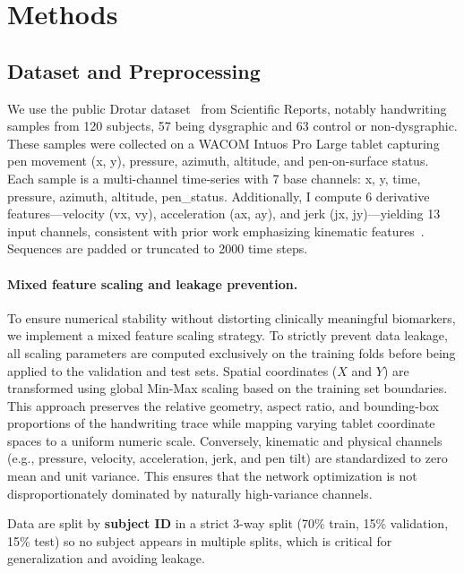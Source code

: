 \documentclass{article}
\begin{document}
\section{Methods}
\label{sec:methods}

\subsection{Dataset and Preprocessing}

We use the public Drotar dataset~\cite{drotar2020} from Scientific Reports, notably handwriting samples from 120 subjects, 57 being dysgraphic and 63 control or non-dysgraphic. These samples were collected on a WACOM Intuos Pro Large tablet capturing pen movement (x, y), pressure, azimuth, altitude, and pen-on-surface status. Each sample is a multi-channel time-series with 7 base channels: x, y, time, pressure, azimuth, altitude, pen\_status. Additionally, I compute 6 derivative features---velocity (vx, vy), acceleration (ax, ay), and jerk (jx, jy)---yielding 13 input channels, consistent with prior work emphasizing kinematic features~\cite{drotar2020, kunhoth2022}. Sequences are padded or truncated to 2000 time steps.

\paragraph{Mixed feature scaling and leakage prevention.} To ensure numerical stability without distorting clinically meaningful biomarkers, we implement a mixed feature scaling strategy. To strictly prevent data leakage, all scaling parameters are computed exclusively on the training folds before being applied to the validation and test sets. Spatial coordinates ($X$ and $Y$) are transformed using global Min-Max scaling based on the training set boundaries. This approach preserves the relative geometry, aspect ratio, and bounding-box proportions of the handwriting trace while mapping varying tablet coordinate spaces to a uniform numeric scale. Conversely, kinematic and physical channels (e.g., pressure, velocity, acceleration, jerk, and pen tilt) are standardized to zero mean and unit variance. This ensures that the network optimization is not disproportionately dominated by naturally high-variance channels. 

Data are split by \textbf{subject ID} in a strict 3-way split (70\% train, 15\% validation, 15\% test) so no subject appears in multiple splits, which is critical for generalization and avoiding leakage.
\end{document}
